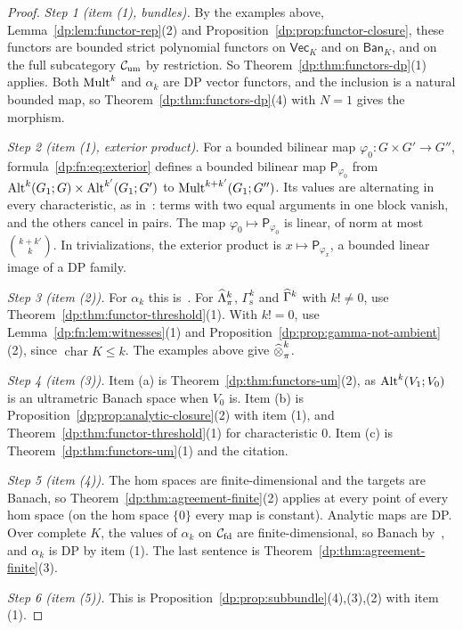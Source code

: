 \begin{proof}
\emph{Step 1 (item (1), bundles).} By the examples above, Lemma~\ref{dp:lem:functor-rep}(2) and Proposition~\ref{dp:prop:functor-closure}, these functors are bounded strict polynomial functors on $\mathsf{Vec}_K$ and on $\mathsf{Ban}_K$, and on the full subcategory $\mathcal{C}_{\rm um}$ by restriction. So Theorem~\ref{dp:thm:functors-dp}(1) applies. Both $\operatorname{Mult}^k$ and $\alpha_k$ are DP vector functors, and the inclusion is a natural bounded map, so Theorem~\ref{dp:thm:functors-dp}(4) with $N=1$ gives the morphism.

\emph{Step 2 (item (1), exterior product).} For a bounded bilinear map $\varphi_0\colon G\times G'\to G''$, formula~\eqref{dp:fn:eq:exterior} defines a bounded bilinear map $\mathsf P_{\varphi_0}$ from $\operatorname{Alt}^k(G_1;G)\times\operatorname{Alt}^{k'}(G_1;G')$ to $\operatorname{Mult}^{k+k'}(G_1;G'')$. Its values are alternating in every characteristic, as in~\cite[proof of Theorem~10.7, Step~2]{I}: terms with two equal arguments in one block vanish, and the others cancel in pairs. The map $\varphi_0\mapsto\mathsf P_{\varphi_0}$ is linear, of norm at most $\binom{k+k'}k$. In trivializations, the exterior product is $x\mapsto\mathsf P_{\varphi_x}$, a bounded linear image of a DP family.

\emph{Step 3 (item (2)).} For $\alpha_k$ this is~\cite[Corollary~7.3]{I}. For $\widehat\Lambda^k_\pi$, $\Gamma^k_{\mathrm s}$ and $\widehat\Gamma^k$ with $k!\ne0$, use Theorem~\ref{dp:thm:functor-threshold}(1). With $k!=0$, use Lemma~\ref{dp:fn:lem:witnesses}(1) and Proposition~\ref{dp:prop:gamma-not-ambient}(2), since $\operatorname{char}K\le k$. The examples above give $\mathbin{\widehat\otimes}^k_\pi$.

\emph{Step 4 (item (3)).} Item (a) is Theorem~\ref{dp:thm:functors-um}(2), as $\operatorname{Alt}^k(V_1;V_0)$ is an ultrametric Banach space when $V_0$ is. Item (b) is Proposition~\ref{dp:prop:analytic-closure}(2) with item (1), and Theorem~\ref{dp:thm:functor-threshold}(1) for characteristic $0$. Item (c) is Theorem~\ref{dp:thm:functors-um}(1) and the citation.

\emph{Step 5 (item (4)).} The hom spaces are finite-dimensional and the targets are Banach, so Theorem~\ref{dp:thm:agreement-finite}(2) applies at every point of every hom space (on the hom space $\{0\}$ every map is constant). Analytic maps are DP. Over complete $K$, the values of $\alpha_k$ on $\mathcal{C}_{\rm fd}$ are finite-dimensional, so Banach by~\cite[Lemma~A.3]{I}, and $\alpha_k$ is DP by item (1). The last sentence is Theorem~\ref{dp:thm:agreement-finite}(3).

\emph{Step 6 (item (5)).} This is Proposition~\ref{dp:prop:subbundle}(4),(3),(2) with item (1).
\end{proof}
